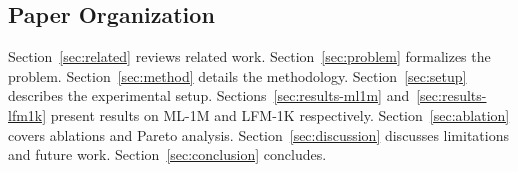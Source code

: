 \subsection{Paper Organization}

Section~\ref{sec:related} reviews related work. Section~\ref{sec:problem} formalizes the problem. Section~\ref{sec:method} details the methodology. Section~\ref{sec:setup} describes the experimental setup. Sections~\ref{sec:results-ml1m} and~\ref{sec:results-lfm1k} present results on ML-1M and LFM-1K respectively. Section~\ref{sec:ablation} covers ablations and Pareto analysis. Section~\ref{sec:discussion} discusses limitations and future work. Section~\ref{sec:conclusion} concludes.
